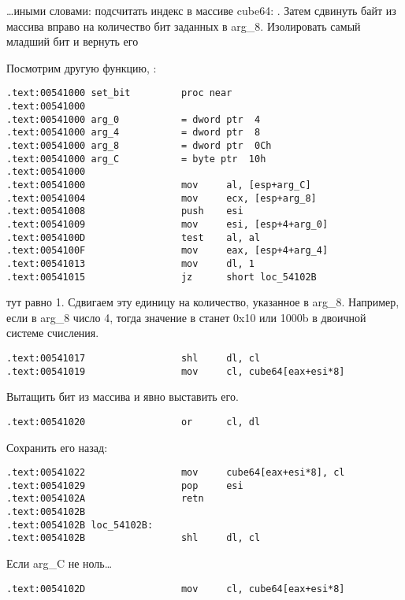 \dots иными словами: подсчитать индекс в массиве cube64: .
Затем сдвинуть байт из массива вправо на количество бит заданных в arg\_8. 
Изолировать самый младший бит и вернуть его

Посмотрим другую функцию, :

\begin{lstlisting}[style=customasm]
.text:00541000 set_bit         proc near
.text:00541000
.text:00541000 arg_0           = dword ptr  4
.text:00541000 arg_4           = dword ptr  8
.text:00541000 arg_8           = dword ptr  0Ch
.text:00541000 arg_C           = byte ptr  10h
.text:00541000
.text:00541000                 mov     al, [esp+arg_C]
.text:00541004                 mov     ecx, [esp+arg_8]
.text:00541008                 push    esi
.text:00541009                 mov     esi, [esp+4+arg_0]
.text:0054100D                 test    al, al
.text:0054100F                 mov     eax, [esp+4+arg_4]
.text:00541013                 mov     dl, 1
.text:00541015                 jz      short loc_54102B
\end{lstlisting}

 тут равно 1. Сдвигаем эту единицу на количество, указанное в arg\_8. Например, если в arg\_8 число 4,
тогда значение в  станет 0x10 или 1000b в двоичной системе счисления.

\begin{lstlisting}[style=customasm]
.text:00541017                 shl     dl, cl
.text:00541019                 mov     cl, cube64[eax+esi*8]
\end{lstlisting}

Вытащить бит из массива и явно выставить его. %

\begin{lstlisting}[style=customasm]
.text:00541020                 or      cl, dl
\end{lstlisting}

Сохранить его назад: %

\begin{lstlisting}[style=customasm]
.text:00541022                 mov     cube64[eax+esi*8], cl
.text:00541029                 pop     esi
.text:0054102A                 retn
.text:0054102B
.text:0054102B loc_54102B:
.text:0054102B                 shl     dl, cl
\end{lstlisting}

Если arg\_C не ноль\dots

\begin{lstlisting}[style=customasm]
.text:0054102D                 mov     cl, cube64[eax+esi*8]
\end{lstlisting}

